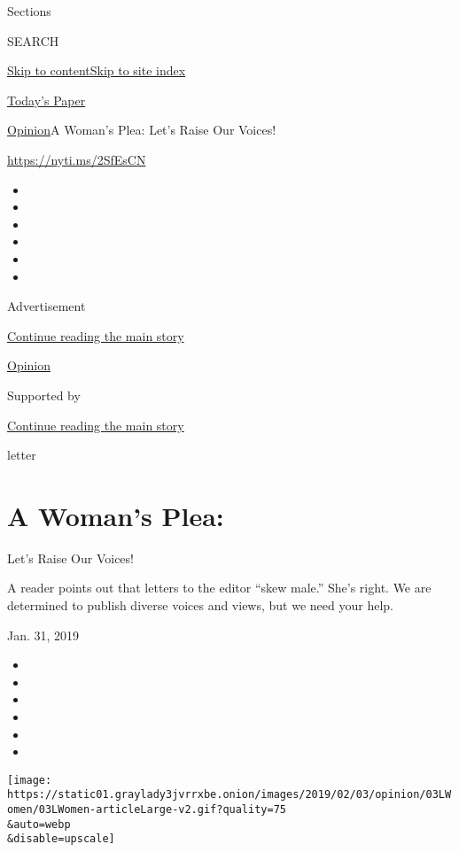 Sections

SEARCH

\protect\hyperlink{site-content}{Skip to
content}\protect\hyperlink{site-index}{Skip to site index}

\href{https://myaccount.nytimes3xbfgragh.onion/auth/login?response_type=cookie\&client_id=vi}{}

\href{https://www.nytimes3xbfgragh.onion/section/todayspaper}{Today's
Paper}

\href{/section/opinion}{Opinion}\textbar{}A Woman's Plea: Let's Raise
Our Voices!

\url{https://nyti.ms/2SfEsCN}

\begin{itemize}
\item
\item
\item
\item
\item
\item
\end{itemize}

Advertisement

\protect\hyperlink{after-top}{Continue reading the main story}

\href{/section/opinion}{Opinion}

Supported by

\protect\hyperlink{after-sponsor}{Continue reading the main story}

letter

\hypertarget{a-womans-plea}{%
\section{A Woman's Plea:}\label{a-womans-plea}}

Let's Raise Our Voices!

A reader points out that letters to the editor ``skew male.'' She's
right. We are determined to publish diverse voices and views, but we
need your help.

Jan. 31, 2019

\begin{itemize}
\item
\item
\item
\item
\item
\item
\end{itemize}

\texttt{[image: https://static01.graylady3jvrrxbe.onion/images/2019/02/03/opinion/03LWomen/03LWomen-articleLarge-v2.gif?quality=75\\\&auto=webp\\\&disable=upscale]}

